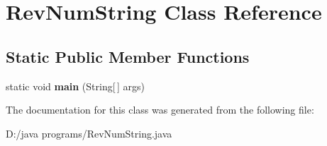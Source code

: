 \hypertarget{class_rev_num_string}{}\section{Rev\+Num\+String Class Reference}
\label{class_rev_num_string}
\subsection*{Static Public Member Functions}
\begin{DoxyCompactItemize}
\item 
\mbox{\label{class_rev_num_string_ad219a3db58f6792a18c08d69a02664dd}} 
static void {\bfseries main} (String\mbox{[}$\,$\mbox{]} args)
\end{DoxyCompactItemize}


The documentation for this class was generated from the following file\+:\begin{DoxyCompactItemize}
\item 
D\+:/java programs/Rev\+Num\+String.\+java\end{DoxyCompactItemize}
